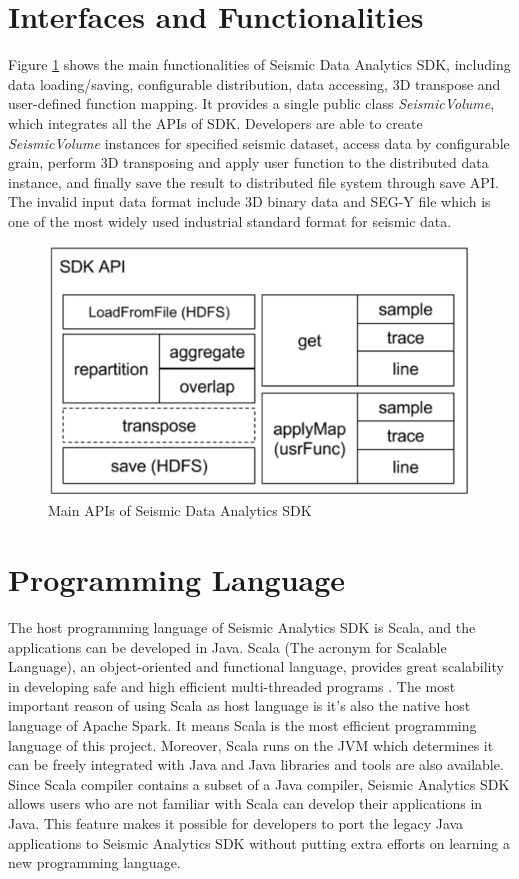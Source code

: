 \section{Interfaces and Functionalities}

Figure \ref{sdk_interface} shows the main functionalities of Seismic Data Analytics SDK, including data loading/saving, configurable distribution, data accessing, 3D transpose and user-defined function mapping. It provides a single public class \emph{SeismicVolume}, which integrates all the APIs of SDK. Developers are able to create \emph{SeismicVolume} instances for specified seismic dataset, access data by configurable grain, perform 3D transposing and apply user function to the distributed data instance, and finally save the result to distributed file system through save API. The invalid input data format include 3D binary data and SEG-Y file \cite{SEGDREV21} which is one of the most widely used industrial standard format for seismic data.

\begin{figure}[h]
\centering
\includegraphics[scale=0.6]{figures/sdk_interface.png}
\caption{Main APIs of Seismic Data Analytics SDK}
\label{sdk_interface}
\end{figure}

\section{Programming Language}

The host programming language of Seismic Analytics SDK is Scala, and the applications can be developed in Java. Scala (The acronym for Scalable Language), an object-oriented and functional language, provides great scalability in developing safe and high efficient multi-threaded programs \cite{ScalaOrg}. The most important reason of using Scala as host language is it's also the native host language of Apache Spark. It means Scala is the most efficient programming language of this project. Moreover, Scala runs on the JVM which determines it can be freely integrated with Java and Java libraries and tools are also available. Since Scala compiler contains a subset of a Java compiler, Seismic Analytics SDK allows users who are not familiar with Scala can develop their applications in Java. This feature makes it possible for developers to port the legacy Java applications to Seismic Analytics SDK without putting extra efforts on learning a new programming language.
